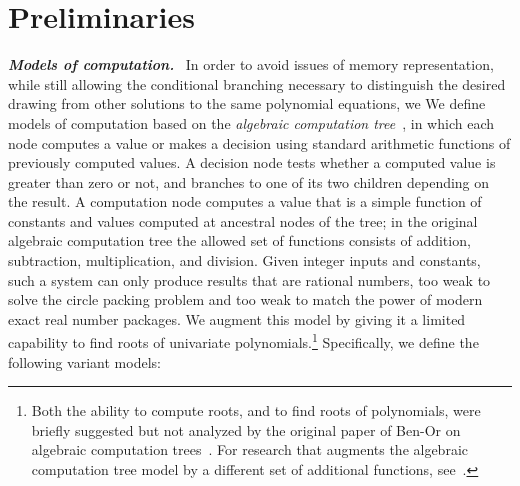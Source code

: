 \documentclass[oribibl,10pt]{llncs}
\newcommand{\Emph}[1]{\smallskip\textbf{\textit{#1}}~}
\newcommand{\nth}[1]{}
\begin{document}
\section{Preliminaries}

\Emph{Models of computation.}
\ifFull
In order to avoid issues of memory representation, 
while still allowing the conditional branching necessary 
to distinguish the desired drawing from other 
solutions to the same polynomial equations, we 
\else
We
\fi
define models of computation based on the \emph{algebraic computation tree}~\cite{Ben-STOC-83,Yao-SJC-91}, in which each node computes a value or makes a decision using standard arithmetic functions of previously computed values.
\ifFull
A decision node tests whether a computed value is greater than zero or not, and branches to one of its two children depending on the result.
A computation node computes a value that is a simple function of constants and values computed at ancestral nodes of the tree; in the original algebraic computation tree the allowed set of functions consists of addition, subtraction, multiplication, and division. 
Given integer inputs and constants, such a system can only produce results that are rational numbers, too weak to solve the circle packing problem and too weak to match the power of modern exact real number packages.
We augment this model by giving it a limited capability to find roots of univariate polynomials.\footnote{Both the ability to compute \nth{k} roots, and to find roots of polynomials, were briefly suggested but not analyzed by the original paper of Ben-Or on algebraic computation trees~\cite{Ben-STOC-83}. For research that augments the algebraic computation tree model by a different set of additional functions, see~\cite{GriVor-TCS-96}.} 
\fi
{} Specifically, we define the following variant models:
\end{document}
